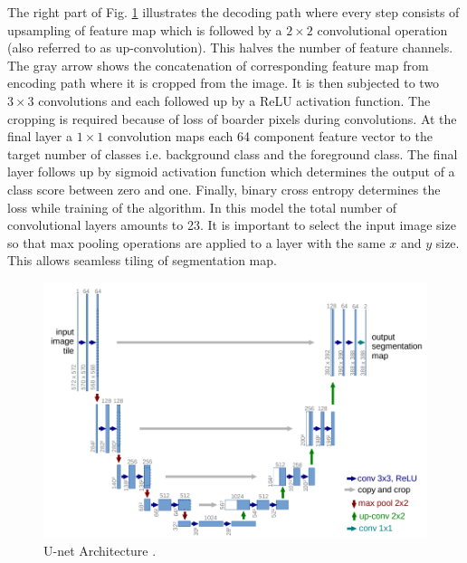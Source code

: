 \documentclass[11pt]{article}
\begin{document}

The right part of Fig. \ref{fig:U-net} illustrates the decoding path where every step consists of upsampling of feature map which is followed by a $2\times2$ convolutional operation (also referred to as up-convolution). This halves the number of feature channels. The gray arrow shows the concatenation of corresponding feature map from encoding path where it is cropped from the image. It is then subjected to two $3\times3$ convolutions and each followed up by a ReLU activation function. The cropping is required because of loss of boarder pixels during convolutions. At the final layer a $1\times1$ convolution maps each 64 component feature vector to the target number of classes i.e. background class and the foreground class. The final layer follows up by sigmoid activation function which determines the output of a class score between zero and one. Finally, binary cross entropy determines the loss while training of the algorithm. In this model the total number of convolutional layers amounts to 23. It is important to select the input image size so that max pooling operations are applied to a layer with the same $x$ and $y$ size. This allows seamless tiling of segmentation map.

\begin{figure}[ht!]
	\centering
	\includegraphics[width=.7\linewidth]{files/unet/arch.png}
	\caption{U-net Architecture \cite{ronneberger2015u}.}
	\label{fig:U-net}
\end{figure} 
\end{document}
